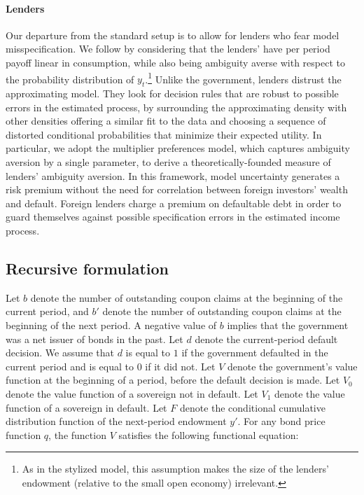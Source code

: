 \paragraph{Lenders} Our departure from the standard setup is to allow for lenders who fear model misspecification. We follow \cite{PouzoPresno2016} by considering that the lenders’ have per period payoff linear in consumption, while also being ambiguity averse with respect to the probability distribution of $y_t$.\footnote{As in the stylized model, this assumption makes the size of the lenders' endowment (relative to the small open economy) irrelevant.} Unlike the government, lenders distrust the approximating model. They look for decision rules that are robust to possible errors in the estimated process, by surrounding the approximating density with other densities offering a similar fit to the data and choosing a sequence of distorted conditional probabilities that minimize their expected utility. In particular, we adopt the \cite{HansenSargent2001} multiplier preferences model, which captures ambiguity aversion by a single parameter, to derive a theoretically-founded measure of lenders' ambiguity aversion. In this framework, model uncertainty generates a risk premium without the need for correlation between foreign investors' wealth and default. Foreign lenders charge a premium on defaultable debt in order to guard themselves against possible specification errors in the estimated income process. 


\subsection{Recursive formulation\label{Recursive}}

Let $b$ denote the number of outstanding coupon claims at the beginning of the current period, and $b'$ denote the number of
outstanding coupon claims at the beginning of the next period. A negative value of $b$ implies that the government was a net issuer
of bonds in the past. Let $d$ denote the current-period default decision. We assume that $d$ is equal to $1$ if the government
defaulted in the current period and is equal to $0$ if it did not. Let $V$ denote the government's value function at the beginning of a
period, before the default decision is made.  Let $V_0$ denote the value function of a sovereign not in default.  Let $V_1$
denote the value function of a sovereign in default.  Let $F$ denote the conditional cumulative distribution function of the next-period
endowment $y'$. For any bond price function $q$, the function $V$ satisfies the following functional equation:

